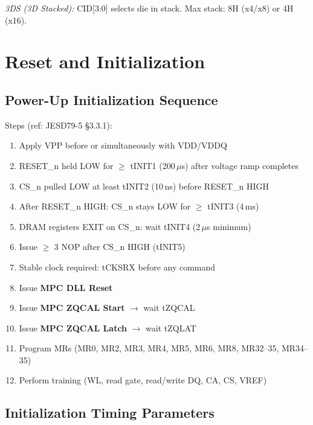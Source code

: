 \documentclass[10pt,a4paper,twoside]{article}
\begin{document}
\textit{3DS (3D Stacked):} CID[3:0] selects die in stack. Max stack: 8H (x4/x8) or 4H (x16).

\section{Reset and Initialization}

\subsection{Power-Up Initialization Sequence}

Steps (ref: JESD79-5 \S3.3.1):
\begin{enumerate}[itemsep=2pt]
  \item Apply VPP before or simultaneously with VDD/VDDQ
  \item RESET\_n held LOW for $\geq$ tINIT1 (200\,$\mu$s) after voltage ramp completes
  \item CS\_n pulled LOW at least tINIT2 (10\,ns) before RESET\_n HIGH
  \item After RESET\_n HIGH: CS\_n stays LOW for $\geq$ tINIT3 (4\,ms)
  \item DRAM registers EXIT on CS\_n: wait tINIT4 (2\,$\mu$s minimum)
  \item Issue $\geq$ 3 NOP after CS\_n HIGH (tINIT5)
  \item Stable clock required: tCKSRX before any command
  \item Issue \textbf{MPC DLL Reset}
  \item Issue \textbf{MPC ZQCAL Start} $\rightarrow$ wait tZQCAL
  \item Issue \textbf{MPC ZQCAL Latch} $\rightarrow$ wait tZQLAT
  \item Program MRs (MR0, MR2, MR3, MR4, MR5, MR6, MR8, MR32--35, MR34--35)
  \item Perform training (WL, read gate, read/write DQ, CA, CS, VREF)
\end{enumerate}

\subsection{Initialization Timing Parameters}
\end{document}
